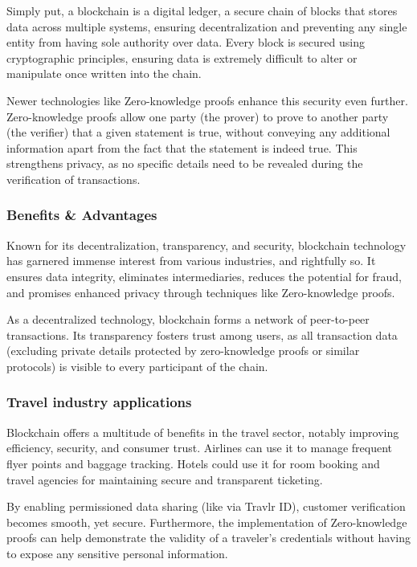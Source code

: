 \documentclass{article}
\begin{document}
Simply put, a blockchain is a digital ledger, a secure chain of blocks that stores data across multiple systems, ensuring decentralization and preventing any single entity from having sole authority over data. Every block is secured using cryptographic principles, ensuring data is extremely difficult to alter or manipulate once written into the chain.

Newer technologies like Zero-knowledge proofs enhance this security even further. Zero-knowledge proofs allow one party (the prover) to prove to another party (the verifier) that a given statement is true, without conveying any additional information apart from the fact that the statement is indeed true. This strengthens privacy, as no specific details need to be revealed during the verification of transactions.

\subsubsection{Benefits \& Advantages}

Known for its decentralization, transparency, and security, blockchain technology has garnered immense interest from various industries, and rightfully so. It ensures data integrity, eliminates intermediaries, reduces the potential for fraud, and promises enhanced privacy through techniques like Zero-knowledge proofs. 

As a decentralized technology, blockchain forms a network of peer-to-peer transactions. Its transparency fosters trust among users, as all transaction data (excluding private details protected by zero-knowledge proofs or similar protocols) is visible to every participant of the chain.

\subsubsection{Travel industry applications}

Blockchain offers a multitude of benefits in the travel sector, notably improving efficiency, security, and consumer trust. Airlines can use it to manage frequent flyer points and baggage tracking. Hotels could use it for room booking and travel agencies for maintaining secure and transparent ticketing.

By enabling permissioned data sharing (like via Travlr ID), customer verification becomes smooth, yet secure. Furthermore, the implementation of Zero-knowledge proofs can help demonstrate the validity of a traveler's credentials without having to expose any sensitive personal information.
\end{document}

